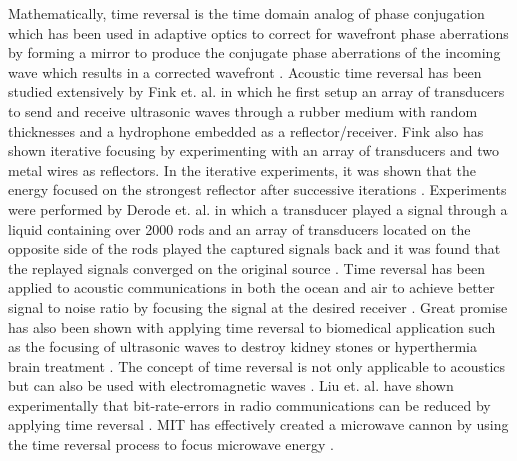 Mathematically, time reversal is the time domain analog of phase conjugation which has been used in adaptive optics to correct for wavefront phase aberrations by forming a mirror to produce the conjugate phase aberrations of the incoming wave which results in a corrected wavefront \cite{Pepper1982}. Acoustic time reversal has been studied extensively by Fink et. al. in which he first setup an array of transducers to send and receive ultrasonic waves through a rubber medium with random thicknesses and a hydrophone embedded as a reflector/receiver.  Fink also has shown iterative focusing by experimenting with an array of transducers and two metal wires as reflectors. In the iterative experiments, it was shown that the energy focused on the strongest reflector after successive iterations \cite{Fink1993}. Experiments were performed by Derode et. al. in which a transducer played a signal through a liquid containing over 2000 rods and an array of transducers located on the opposite side of the rods played the captured signals back and it was found that the replayed signals converged on the original source \cite{Derode1995}. Time reversal has been applied to acoustic communications in both the ocean and air to achieve better signal to noise ratio by focusing the signal at the desired receiver \cite{Smith2003, Song2012, Shimura2012}. Great promise has also been shown with applying time reversal to biomedical application such as the focusing of ultrasonic waves to destroy kidney stones or hyperthermia brain treatment \cite{Fink2003}. The concept of time reversal is not only applicable to acoustics but can also be used with electromagnetic waves \cite{Lerosey2004}. Liu et. al. have shown experimentally that bit-rate-errors in radio communications can be reduced by applying time reversal \cite{Liu2008}. MIT has effectively created a microwave cannon by using the time reversal process to focus microwave energy \cite{Davy2010}.

